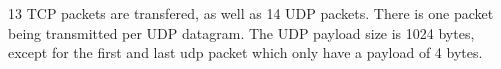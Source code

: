 13 TCP packets are transfered, as well as 14 UDP packets. There is one packet being transmitted per UDP datagram.
The UDP payload size is 1024 bytes, except for the first and last udp packet which only have a payload of 4 bytes.